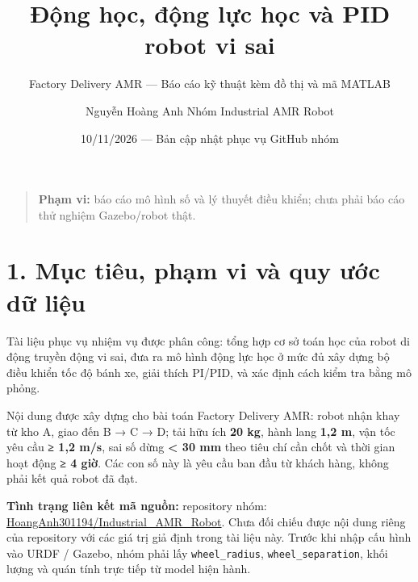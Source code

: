 \documentclass[
  12pt,
  a4paper,
]{article}
\title{Động học, động lực học và PID robot vi sai}
\subtitle{Factory Delivery AMR --- Báo cáo kỹ thuật kèm đồ thị và mã
MATLAB}
\author{Nguyễn Hoàng Anh \textbar{} Nhóm Industrial AMR Robot}
\date{10/11/2026 --- Bản cập nhật phục vụ GitHub nhóm}
\begin{document}
\maketitle

{
\hypersetup{linkcolor=}
\setcounter{tocdepth}{3}
\tableofcontents
}
\begin{quote}
\textbf{Phạm vi:} báo cáo mô hình số và lý thuyết điều khiển; chưa phải
báo cáo thử nghiệm Gazebo/robot thật.
\end{quote}

\section{1. Mục tiêu, phạm vi và quy ước dữ
liệu}\label{mux1ee5c-tiuxeau-phux1ea1m-vi-vuxe0-quy-ux1b0ux1edbc-dux1eef-liux1ec7u}

Tài liệu phục vụ nhiệm vụ được phân công: tổng hợp cơ sở toán học của
robot di động truyền động vi sai, đưa ra mô hình động lực học ở mức đủ
xây dựng bộ điều khiển tốc độ bánh xe, giải thích PI/PID, và xác định
cách kiểm tra bằng mô phỏng.

Nội dung được xây dựng cho bài toán Factory Delivery AMR: robot nhận
khay từ kho A, giao đến B → C → D; tải hữu ích \textbf{20 kg}, hành lang
\textbf{1,2 m}, vận tốc yêu cầu \textbf{≥ 1,2 m/s}, sai số dừng
\textbf{\textless{} 30 mm} theo tiêu chí cần chốt và thời gian hoạt động
\textbf{≥ 4 giờ}. Các con số này là yêu cầu ban đầu từ khách hàng, không
phải kết quả robot đã đạt.

\textbf{Tình trạng liên kết mã nguồn:} repository nhóm:
\href{https://github.com/HoangAnh301194/Industrial_AMR_Robot}{HoangAnh301194/Industrial\_AMR\_Robot}.
Chưa đối chiếu được nội dung riêng của repository với các giá trị giả
định trong tài liệu này. Trước khi nhập cấu hình vào URDF / Gazebo, nhóm
phải lấy \texttt{wheel\_radius}, \texttt{wheel\_separation}, khối lượng
và quán tính trực tiếp từ model hiện hành.
\end{document}
